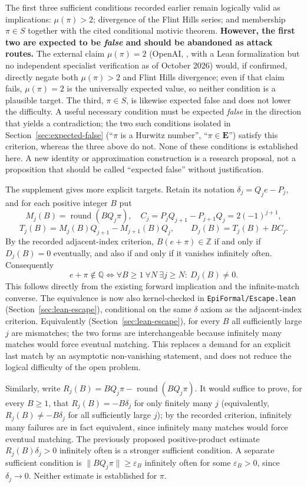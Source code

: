 \documentclass[11pt]{amsart}
\theoremstyle{definition}
\theoremstyle{remark}
\numberwithin{equation}{section}
\newcommand{\Q}{\mathbb{Q}}
\newcommand{\Z}{\mathbb{Z}}
\newcommand{\irr}{\mu}
\begin{document}
The first three sufficient conditions recorded earlier remain logically valid as implications: $\irr(\pi)>2$; divergence of the Flint Hills series; and membership $\pi\in S$ together with the cited conditional motivic theorem. \textbf{However, the first two are expected to be \emph{false} and should be abandoned as attack routes.} The external claim $\irr(\pi)=2$ (OpenAI, \cite{OpenAI2026}, with a Lean formalization but no independent specialist verification as of October 2026) would, if confirmed, directly negate both $\irr(\pi)>2$ and Flint Hills divergence; even if that claim fails, $\irr(\pi)=2$ is the universally expected value, so neither condition is a plausible target. The third, $\pi\in S$, is likewise expected false and does not lower the difficulty. A useful necessary condition must be expected \emph{false} in the direction that yields a contradiction; the two such conditions isolated in Section~\ref{sec:expected-false} (``$\pi$ is a Hurwitz number'', ``$\pi\in\mathbf{E}$'') satisfy this criterion, whereas the three above do not. None of these conditions is established here. A new identity or approximation construction is a research proposal, not a proposition that should be called ``expected false'' without justification.

The supplement gives more explicit targets. Retain its notation $\delta_j=Q_je-P_j$, and for each positive integer $B$ put
\[
M_j(B)=\operatorname{round}(BQ_j\pi),\quad
C_j=P_jQ_{j+1}-P_{j+1}Q_j=2(-1)^{j+1},
\]
\[
T_j(B)=M_j(B)Q_{j+1}-M_{j+1}(B)Q_j,\qquad
D_j(B)=T_j(B)+BC_j.
\]
By the recorded adjacent-index criterion, $B(e+\pi)\in\Z$ if and only if $D_j(B)=0$ eventually, and also if and only if it vanishes infinitely often. Consequently
\[
e+\pi\notin\Q
\iff \forall B\ge1\ \forall N\ \exists j\ge N:\ D_j(B)\ne0.
\]
This follows directly from the existing forward implication and the infinite-match converse. The equivalence is now also kernel-checked in \texttt{EpiFormal/Escape.lean} (Section~\ref{sec:lean-escape}), conditional on the same $\delta$ axiom as the adjacent-index criterion. Equivalently (Section~\ref{sec:lean-escape}), for every $B$ all sufficiently large $j$ are mismatches; the two forms are interchangeable because infinitely many matches would force eventual matching. This replaces a demand for an explicit last match by an asymptotic non-vanishing statement, and does not reduce the logical difficulty of the open problem.

Similarly, write $R_j(B)=BQ_j\pi-\operatorname{round}(BQ_j\pi)$. It would suffice to prove, for every $B\ge1$, that $R_j(B)=-B\delta_j$ for only finitely many $j$ (equivalently, $R_j(B)\ne-B\delta_j$ for all sufficiently large $j$); by the recorded criterion, infinitely many failures are in fact equivalent, since infinitely many matches would force eventual matching. The previously proposed positive-product estimate $R_j(B)\delta_j>0$ infinitely often is a stronger sufficient condition. A separate sufficient condition is $\|BQ_j\pi\|\ge\varepsilon_B$ infinitely often for some $\varepsilon_B>0$, since $\delta_j\to0$. Neither estimate is established for $\pi$.
\end{document}
